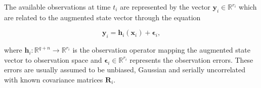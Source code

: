 \documentclass[review]{elsarticle}
\begin{document}
The available observations at time $t_{i}$ are represented by the vector $\textbf{y}_{i} \in \mathbb{R}^{r_{i}}$ which are related to the augmented state vector through the equation
\begin{linenomath}
\begin{equation}
\textbf{y}_{i}=\textbf{h}_{i}(\textbf{x}_{i})+ \mathbf{ \epsilon}_{i},
\end{equation} 
\end{linenomath}
where $\textbf{h}_{i}: \mathbb{R}^{q+n} \rightarrow \mathbb{R}^{r_{i}}$ is the observation operator mapping the augmented state vector to observation space and $\mathbf{\epsilon}_{i} \in \mathbb{R}^{r_{i}}$ represents the observation errors. These errors are usually assumed to be unbiased, Gaussian and serially uncorrelated with known covariance matrices $\textbf{R}_{i}$.
\end{document}
